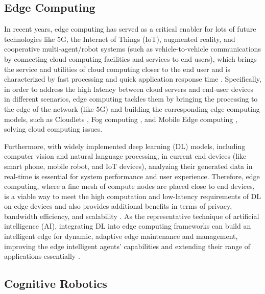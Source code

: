 \documentclass[letterpaper]{article} %
\begin{document}
\subsection{Edge Computing}
In recent years, edge computing has served as a critical enabler for lots of future technologies like 5G, the Internet of Things (IoT), augmented reality, and cooperative multi-agent/robot systems (such as vehicle-to-vehicle communications by connecting cloud computing facilities and services to end users), which brings the service and utilities of cloud computing closer to the end user and is characterized by fast processing and quick application response time \cite{khan2019edge}. Specifically, in order to address the high latency between cloud servers and end-user devices in different scenarios, edge computing tackles them by bringing the processing to the edge of the network (like 5G) and building the corresponding edge computing models, such as Cloudlets \cite{shaukat2016cloudlet}, Fog computing \cite{bao2017follow}, and Mobile Edge computing \cite{ahmed2017mobile}, solving cloud computing issues. 

Furthermore, with widely implemented deep learning (DL) models, including computer vision and natural language processing, in current end devices (like smart phone, mobile robot, and IoT devices), analyzing their generated data in real-time is essential for system performance and user experience. Therefore, edge computing, where a fine mesh of compute nodes are placed close to end devices, is a viable way to meet the high computation and low-latency requirements of DL on edge devices and also provides additional benefits in terms of privacy, bandwidth efficiency, and scalability \cite{chen2019deep}. As the representative technique of artificial intelligence (AI), integrating DL into edge computing frameworks can build an intelligent edge for dynamic, adaptive edge maintenance and management, improving the edge intelligent agents' capabilities and extending their range of applications essentially \cite{wang2020convergence}.

\subsection{Cognitive Robotics}
\end{document}
